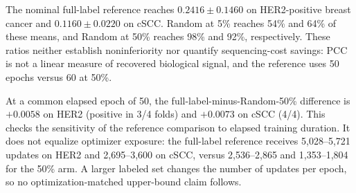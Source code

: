 \documentclass[]{spie}
\begin{document}
The nominal full-label reference reaches $0.2416\pm0.1460$ on HER2-positive breast cancer and $0.1160\pm0.0220$ on cSCC. Random at 5\% reaches 54\% and 64\% of these means, and Random at 50\% reaches 98\% and 92\%, respectively. These ratios neither establish noninferiority nor quantify sequencing-cost savings: PCC is not a linear measure of recovered biological signal, and the reference uses 50 epochs versus 60 at 50\%.

At a common elapsed epoch of 50, the full-label-minus-Random-50\% difference is $+0.0058$ on HER2 (positive in 3/4 folds) and $+0.0073$ on cSCC (4/4). This checks the sensitivity of the reference comparison to elapsed training duration. It does not equalize optimizer exposure: the full-label reference receives 5,028--5,721 updates on HER2 and 2,695--3,600 on cSCC, versus 2,536--2,865 and 1,353--1,804 for the 50\% arm. A larger labeled set changes the number of updates per epoch, so no optimization-matched upper-bound claim follows.

\begin{table}[htbp]
\centering
\caption{HER2-positive breast cancer PCC, mean $\pm$ sample SD over four folds. Bold marks the largest mean per budget; cost is the range of logged fold-median scoring times at 50\%. TypiClust-inspired uses three later-session folds; its earlier 1,584-second fold-median outlier is reported separately in the text.}
\label{tab:pcc_her2}
\end{table}
\end{document}
